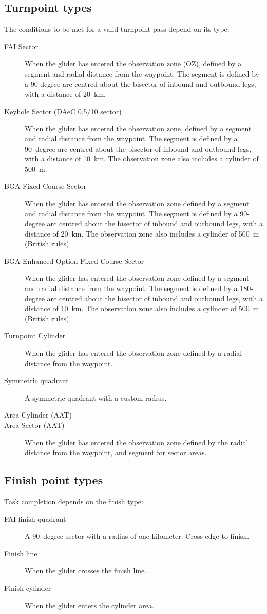 \subsection*{Turnpoint types}
The conditions to be met for a valid turnpoint pass depend on its
 type:
\begin{description}
\item[FAI Sector] When the glider has entered the observation zone (OZ), defined 
by a segment and radial distance from the waypoint.  The segment is
defined by a 90-degree arc centred about the bisector of inbound and
outbound legs, with a distance of 20~km.
\item[Keyhole Sector (DAeC 0.5/10 sector)] When the glider has entered the
observation zone, defined by a segment and radial distance from the waypoint.  The segment is
defined by a 90~degree arc centred about the bisector of inbound and
outbound legs, with a distance of 10~km.  The observation zone also includes
a cylinder of 500~m.
\item[BGA Fixed Course Sector]  When the glider has entered the
observation zone defined by a segment and radial distance from the
waypoint. The segment is defined by a 90-degree arc centred about the
bisector of inbound and outbound legs, with a distance of 20~km.
The observation zone also includes a cylinder of 500~m (British rules).
\item[BGA Enhanced Option Fixed Course Sector]  When the glider has entered the
observation zone defined by a segment and radial distance from the
waypoint. The segment is defined by a 180-degree arc centred about the
bisector of inbound and outbound legs, with a distance of 10~km.
The observation zone also includes a cylinder of 500~m (British rules).
\item[Turnpoint Cylinder]  When the glider has entered the observation zone
defined by a radial distance from the waypoint.
\item[Symmetric quadrant] A symmetric quadrant with a custom radius.
\item[Area Cylinder (AAT)] %
\item[Area Sector (AAT)]  When the glider has entered the observation zone
defined by the radial distance from the waypoint, and segment for sector areas.
\end{description}

\subsection*{Finish point types}
Task completion depends on the finish type:
\begin{description}
\item[FAI finish quadrant] A 90~degree sector with a radius of one kilometer. Cross edge to finish.
\item[Finish line] When the glider crosses the finish line.
\item[Finish cylinder] When the glider enters the cylinder area.
\end{description}

